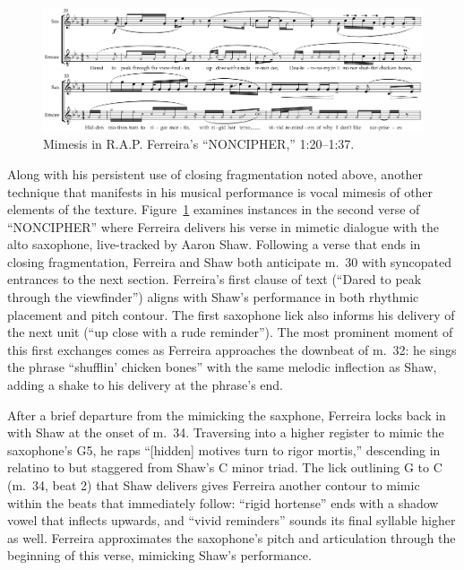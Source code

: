     \begin{figure}[!ht]
        \centering
        \includegraphics[width=\textwidth]{images/figures/chp 03/120137nonciphermimesis.pdf}
        \caption{Mimesis in R.A.P. Ferreira's ``NONCIPHER,'' 1:20--1:37.}
        \label{fig:rorymimesis}
    \end{figure}


Along with his persistent use of closing fragmentation noted above, another technique that manifests in his
musical performance is vocal mimesis of other elements of the texture. Figure~\ref{fig:rorymimesis} examines
instances in the second verse of ``NONCIPHER'' where Ferreira delivers his verse in mimetic dialogue with the
alto saxophone, live-tracked by Aaron Shaw. Following a verse that ends in closing fragmentation, Ferreira and
Shaw both anticipate m.~30 with syncopated entrances to the next section. Ferreira's first clause of text 
(``Dared to peak through the viewfinder'') aligns with Shaw's performance in both rhythmic placement and pitch 
contour. The first saxophone lick also informs his delivery of the next unit (``up close with a rude reminder'').
The most prominent moment of this first exchanges comes as Ferreira approaches the downbeat of m.~32: he sings
the phrase ``shufflin' chicken bones'' with the same melodic inflection as Shaw, adding a shake to his delivery
at the phrase's end.

After a brief departure from the mimicking the saxphone, Ferreira locks back in with Shaw at the onset of m.~34.
Traversing into a higher register to mimic the saxophone's G5, he raps ``[hidden] motives turn to rigor mortis,''
descending in relatino to but staggered from Shaw's C minor triad. The lick outlining G to C (m.~34, beat 2) that
Shaw delivers gives Ferreira another contour to mimic within the beats that immediately follow: ``rigid hortense''
ends with a shadow vowel that inflects upwards, and ``vivid reminders'' sounds its final syllable higher as well.
Ferreira approximates the saxophone's pitch and articulation through the beginning of this verse, mimicking Shaw's
performance.

